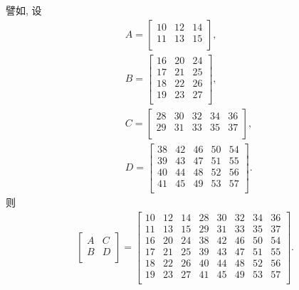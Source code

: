 \documentclass[%
    UTF8,%
    fontset=none,%
    punct=kaiming,%
    zihao=-4,%
    a4paper,%
    oneside,%
]{ctexbook}
\begin{document}
譬如, 设
\begin{align*}
     &
    A = \begin{bmatrix}
            10 & 12 & 14 \\
            11 & 13 & 15 \\
        \end{bmatrix},
    \\
     &
    B = \begin{bmatrix}
            16 & 20 & 24 \\
            17 & 21 & 25 \\
            18 & 22 & 26 \\
            19 & 23 & 27 \\
        \end{bmatrix},
    \\
     &
    C = \begin{bmatrix}
            28 & 30 & 32 & 34 & 36 \\
            29 & 31 & 33 & 35 & 37 \\
        \end{bmatrix},
    \\
     &
    D = \begin{bmatrix}
            38 & 42 & 46 & 50 & 54 \\
            39 & 43 & 47 & 51 & 55 \\
            40 & 44 & 48 & 52 & 56 \\
            41 & 45 & 49 & 53 & 57 \\
        \end{bmatrix}.
\end{align*}
则
\begin{align*}
    \begin{bmatrix}
        A & C \\
        B & D \\
    \end{bmatrix}
    =
    \begin{bmatrix}
        10 & 12 & 14 & 28 & 30 & 32 & 34 & 36 \\
        11 & 13 & 15 & 29 & 31 & 33 & 35 & 37 \\
        16 & 20 & 24 & 38 & 42 & 46 & 50 & 54 \\
        17 & 21 & 25 & 39 & 43 & 47 & 51 & 55 \\
        18 & 22 & 26 & 40 & 44 & 48 & 52 & 56 \\
        19 & 23 & 27 & 41 & 45 & 49 & 53 & 57 \\
    \end{bmatrix}.
\end{align*}
\end{document}
